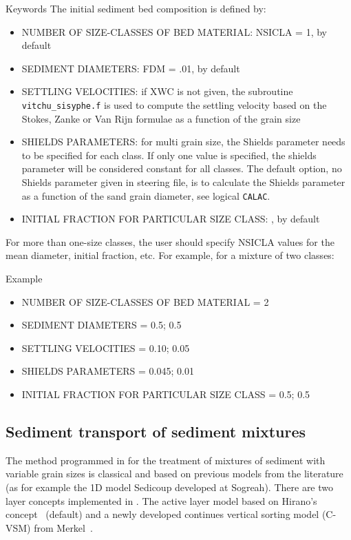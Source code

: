 \medskip
\begin{bclogo}[couleur=blue!10,arrondi=0.1, logo=\bcinfo]{Keywords}
The initial sediment bed composition is defined by:
\begin{itemize}
\item {\ttfamily NUMBER OF SIZE-CLASSES OF BED MATERIAL}: {\ttfamily NSICLA = 1}, by default
\item {\ttfamily SEDIMENT DIAMETERS}: {\ttfamily FDM = .01}, by default
\item {\ttfamily SETTLING VELOCITIES}: if {\ttfamily XWC} is not given, the subroutine \texttt{vitchu\_sisyphe.f} is used to compute the settling velocity based on the Stokes, Zanke or Van Rijn formulae as a function of the grain size
\item {\ttfamily SHIELDS PARAMETERS}: for multi grain size, 
the Shields parameter needs to be specified for each class. If only one 
value is specified, the shields parameter will be considered constant for all classes. The default option, no Shields parameter given in steering file, is to calculate the Shields parameter as a function of the sand grain diameter, see logical \texttt{CALAC}.
\item {\ttfamily INITIAL FRACTION FOR PARTICULAR SIZE CLASS}: , by default
\end{itemize}
\end{bclogo}

For more than one-size classes, the user should specify {\ttfamily NSICLA} values for
the mean diameter, initial fraction, etc. For example, for a mixture of two classes:

\medskip
\begin{bclogo}[couleur=blue!2.5,arrondi=0.1, logo=\bccrayon]{Example}
\begin{itemize}
\item {\ttfamily NUMBER OF SIZE-CLASSES OF BED MATERIAL = 2}
\item {\ttfamily SEDIMENT DIAMETERS = 0.5; 0.5}
\item {\ttfamily SETTLING VELOCITIES = 0.10; 0.05}
\item {\ttfamily SHIELDS PARAMETERS = 0.045; 0.01}
\item {\ttfamily INITIAL FRACTION FOR PARTICULAR SIZE CLASS = 0.5; 0.5}
\end{itemize}
\end{bclogo}


\subsection{Sediment transport of sediment mixtures}
The method programmed in \sisyphe for the treatment of mixtures of sediment with variable grain sizes is classical and based on previous models from the literature (as for example the 1D model Sedicoup developed at Sogreah). There are two layer concepts implemented in \sisyphe. The active layer model based on Hirano's concept~\cite{Hirano} (default) and a newly developed continues vertical sorting model (C-VSM) from Merkel~\cite{([XX], 2012), ([XX], 2012)}.

